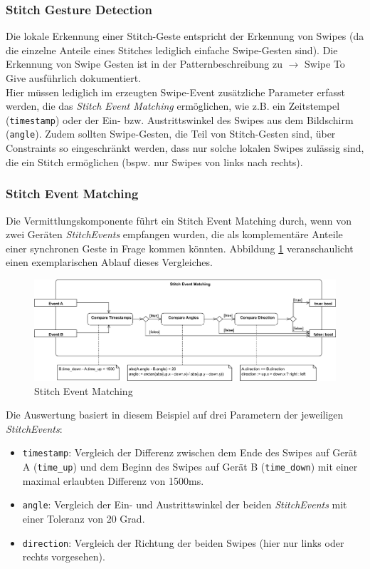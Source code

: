 {\subsubsection*{Stitch Gesture Detection}
Die lokale Erkennung einer Stitch-Geste entspricht der Erkennung von Swipes (da die einzelne Anteile eines Stitches lediglich einfache Swipe-Gesten sind). Die Erkennung von Swipe Gesten ist in der Patternbeschreibung zu $\rightarrow$ Swipe To Give ausführlich dokumentiert.\\

Hier müssen lediglich im erzeugten Swipe-Event zusätzliche Parameter erfasst werden, die das \textit{Stitch Event Matching} ermöglichen, wie z.B. ein Zeitstempel (\texttt{timestamp}) oder der Ein- bzw. Austrittswinkel des Swipes aus dem Bildschirm (\texttt{angle}). Zudem sollten Swipe-Gesten, die Teil von Stitch-Gesten sind, über Constraints so eingeschränkt werden, dass nur solche lokalen Swipes zulässig sind, die ein Stitch ermöglichen (bspw. nur Swipes von links nach rechts).

\subsubsection*{Stitch Event Matching}
Die Vermittlungskomponente führt ein Stitch Event Matching durch, wenn von zwei Geräten \textit{StitchEvents} empfangen wurden, die als komplementäre Anteile einer synchronen Geste in Frage kommen könnten. Abbildung \ref{stitch_event_matching} veranschaulicht einen exemplarischen Ablauf dieses Vergleiches.

\begin{figure}[h]
\includegraphics[width=\textwidth]{stitch_event_matching.png}
\caption{Stitch Event Matching}
\label{stitch_event_matching}
\end{figure}

Die Auswertung basiert in diesem Beispiel auf drei Parametern der jeweiligen \textit{StitchEvents}:
\begin{itemize}
\item \texttt{timestamp}: Vergleich der Differenz zwischen dem Ende des Swipes auf Gerät A (\texttt{time\_up}) und dem Beginn des Swipes auf Gerät B (\texttt{time\_down}) mit einer maximal erlaubten Differenz von 1500ms.
\item \texttt{angle}: Vergleich der Ein- und Austrittswinkel der beiden \textit{StitchEvents} mit einer Toleranz von 20 Grad.
\item \texttt{direction}: Vergleich der Richtung der beiden Swipes (hier nur links oder rechts vorgesehen).
\end{itemize}

}
